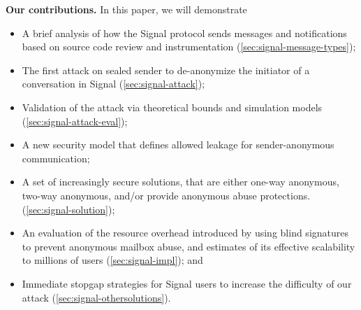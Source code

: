 
\medskip
\noindent
\textbf{Our contributions.} In this paper, we will demonstrate
\begin{itemize}[nosep]
  \item A brief analysis of how the Signal protocol sends messages and
    notifications based on source code review and instrumentation
    (\cref{sec:signal-message-types});
  \item The first attack on sealed sender to de-anonymize the initiator of a conversation in Signal (\cref{sec:signal-attack});
  \item Validation of the attack via theoretical bounds and simulation models (\cref{sec:signal-attack-eval});
  \item A new security model that defines allowed leakage for sender-anonymous communication;
  \item A set of increasingly secure solutions, that are either one-way anonymous, two-way anonymous, and/or provide anonymous abuse protections. (\cref{sec:signal-solution});
  \item An evaluation of the resource overhead introduced by using blind signatures to prevent anonymous mailbox abuse, and estimates of its
    effective scalability to millions of users (\cref{sec:signal-impl}); and
  \item Immediate stopgap strategies for Signal users to increase the difficulty of our attack (\cref{sec:signal-othersolutions}).
\end{itemize}
\vspace{4pt}

